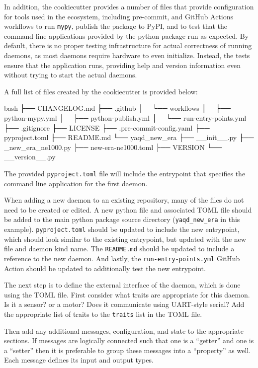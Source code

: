 In addition, the cookiecutter provides a number of files that provide configuration for tools used in the \yaq{} ecosystem, including pre-commit\cite{}, and GitHub Actions\cite{} workflows to run \texttt{mypy}\cite{}, publish the package to PyPI\cite{}, and to test that the command line applications provided by the python package run as expected.
By default, there is no proper testing infrastructure for actual correctness of running daemons, as most daemons require hardware to even initialize.
Instead, the tests ensure that the application runs, providing help and version information even without trying to start the actual daemons.

A full list of files created by the cookiecutter is provided below:

\begin{codefragment}{bash}
├── CHANGELOG.md
├── .github
│   └── workflows
│       ├── python-mypy.yml
│       ├── python-publish.yml
│       └── run-entry-points.yml
├── .gitignore
├── LICENSE
├── .pre-commit-config.yaml
├── pyproject.toml
├── README.md
└── yaqd_new_era
    ├── __init__.py
    ├── _new_era_ne1000.py
    ├── new-era-ne1000.toml
    ├── VERSION
    └── __version__.py
\end{codefragment}

The provided \texttt{pyproject.toml} file will include the entrypoint that specifies the command line application for the first daemon.


When adding a new daemon to an existing repository, many of the files do not need to be created or edited.
A new python file and associated TOML file should be added to the main python package source directory (\texttt{yaqd\_new\_era} in this example).
\texttt{pyproject.toml} should be updated to include the new entrypoint, which should look similar to the existing entrypoint, but updated with the new file and daemon kind name.
The \texttt{README.md} should be updated to include a reference to the new daemon.
And lastly, the \texttt{run-entry-points.yml} GitHub Action should be updated to additionally test the new entrypoint.

The next step is to define the external interface of the daemon, which is done using the TOML file.
First consider what traits are appropriate for this daemon.
Is it a sensor? or a motor?
Does it communicate using UART-style serial?
Add the appropriate list of traits to the \texttt{traits} list in the TOML file.

Then add any additional messages, configuration, and state to the appropriate sections.
If messages are logically connected such that one is a ``getter'' and one is a ``setter'' then it is preferable to group these messages into a ``property'' as well.
Each message defines its input and output types.

